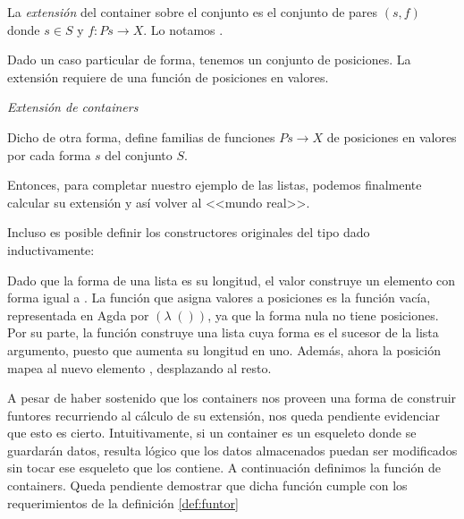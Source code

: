 \vspace{2ex}

\begin{definition}
  La {\it extensión} del container  sobre el conjunto  es el conjunto de pares $(s, f)$ donde $s \in S$ y $f : Ps \to X$.
  Lo notamos .

Dado un caso particular de forma, tenemos un conjunto de posiciones. La extensión requiere de una función de posiciones en valores. 

\begin{agdacode}\label{code:cont:ext}{\it Extensión de containers}

\end{agdacode}

Dicho de otra forma, 
define familias de funciones $P s \to X$ de posiciones en valores por cada forma $s$ del conjunto $S$.
\end{definition}

\begin{example}
Entonces, para completar nuestro ejemplo de las listas, podemos finalmente calcular su extensión y así volver al <<mundo real>>. 


Incluso es posible definir los constructores originales del tipo  dado inductivamente:


Dado que la forma de una lista es su longitud, el valor 
 construye un elemento con forma igual a . La función que asigna valores a posiciones es la función vacía, representada en Agda por $(\lambda\; ())$, ya que la forma nula no tiene posiciones.
Por su parte, la función   construye una lista cuya forma es el sucesor de la lista argumento, puesto que  aumenta su longitud en uno. Además, ahora la posición  mapea al nuevo elemento , desplazando al resto.
\end{example}

  A pesar de haber sostenido que los containers nos proveen una forma de construir funtores recurriendo al cálculo de su extensión, nos queda pendiente evidenciar que esto es cierto. Intuitivamente, si un container es un esqueleto donde se guardarán datos, resulta lógico que los datos almacenados puedan ser modificados sin tocar ese esqueleto que los contiene.
  A continuación definimos la función  de containers. Queda pendiente demostrar que dicha función cumple con los requerimientos de la definición \ref{def:funtor}

